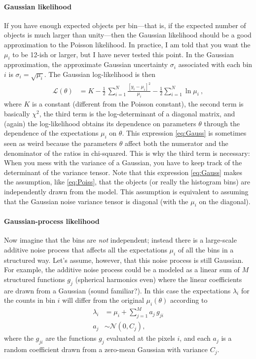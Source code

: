 \documentclass{article}
\begin{document}
\paragraph{Gaussian likelihood}
If you have enough expected objects per bin---that is, if the expected number of objects is much larger than unity---then the Gaussian likelihood should be a good approximation to the Poisson likelihood.
In practice, I am told that you want the $\mu_i$ to be 12-ish or larger, but I have never tested this point.
In the Gaussian approximation, the approximate Gaussian uncertainty $\sigma_i$ associated with each bin $i$ is $\sigma_i=\sqrt{\mu_i}$.
The Gaussian log-likelihood is then
\begin{align}
    \mathscr{L}(\theta) &= K - \frac{1}{2}\,\sum_{i=1}^N\frac{[y_i - \mu_i]^2}{\mu_i} - \frac{1}{2}\sum_{i=1}^N\ln\mu_i \label{eq:Gauss}~,
\end{align}
where $K$ is a constant (different from the Poisson constant),
the second term is basically $\chi^2$,
the third term is the log-determinant of a diagonal matrix,
and (again) the log-likelihood obtains its dependence on parameters $\theta$ through the dependence of the expectations $\mu_i$ on $\theta$.
This expression \eqref{eq:Gauss} is sometimes seen as weird because the parameters $\theta$ affect both the numerator and the denominator of the ratios in chi-squared.
This is why the third term is necessary: When you mess with the variance of a Gaussian, you have to keep track of the determinant of the variance tensor.
Note that this expression \eqref{eq:Gauss} makes the assumption, like \eqref{eq:Poiss}, that the objects (or really the histogram bins) are independently drawn from the model.
This assumption is equivalent to assuming that the Gaussian noise variance tensor is diagonal (with the $\mu_i$ on the diagonal).

\paragraph{Gaussian-process likelihood}
Now imagine that the bins are \emph{not} independent; instead there is a large-scale additive noise process that affects all the expectations $\mu_i$ of all the bins in a structured way.
Let's assume, however, that this noise process is still Gaussian.
For example, the additive noise process could be a modeled as a linear sum of $M$ structured functions $g_j$ (spherical harmonics even) where the linear coefficients are drawn from a Gaussian (sound familiar?).
In this case the expectations $\lambda_i$ for the counts in bin $i$ will differ from the original $\mu_i(\theta)$ according to
\begin{align}
    \lambda_i &= \mu_i + \sum_{j=1}^M a_j\,g_{ji} \\
    a_j &\sim \mathscr{N}(0, C_j) ,
\end{align}
where the $g_{ji}$ are the functions $g_j$ evaluated at the pixels $i$,
and each $a_j$ is a random coefficient drawn from a zero-mean Gaussian with variance $C_j$.
\end{document}
